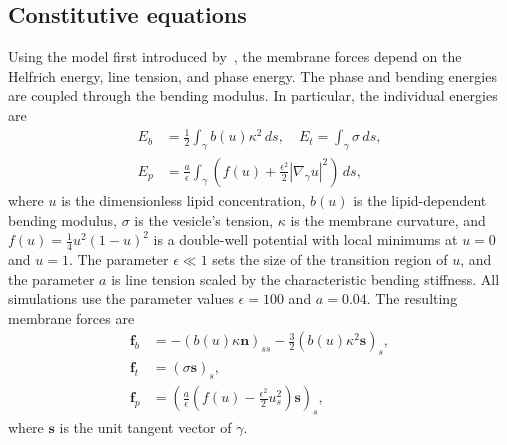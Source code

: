 \documentclass[twoside,twocolumn,9pt]{article}
\newcommand{\ff}{\mathbf{f}}
\newcommand{\nn}{\mathbf{n}}
\renewcommand{\ss}{\mathbf{s}}
\begin{document}
\subsection{Constitutive equations\label{subsec:const_eq}}
Using the model first introduced by~\citet{liu-mar-li-vee-low2017}, the
membrane forces depend on the Helfrich energy, line tension, and phase
energy. The phase and bending energies are coupled through the bending
modulus. In particular, the individual energies are
\begin{align}
  E_b &= \frac{1}{2}\int_{\gamma} b(u) \kappa^2 \, ds, \quad
  E_t = \int_{\gamma} \sigma \, ds, \\
  E_p &= \frac{a}{\epsilon}\int_{\gamma}\left(
  f(u) +\frac{\epsilon^2}{2}|\nabla_\gamma u|^2\right) \, ds,
  \label{eqn:PhaseEnergy}
\end{align}
where $u$ is the dimensionless lipid concentration, $b(u)$ is the
lipid-dependent bending modulus, $\sigma$ is the vesicle's tension,
$\kappa$ is the membrane curvature, and $f(u) = \frac{1}{4}u^2(1-u)^2$
is a double-well potential with local minimums at $u=0$ and $u=1$. The
parameter $\epsilon \ll 1$ sets the size of the transition region of
$u$, and the parameter $a$ is line tension scaled by the characteristic
bending stiffness. All simulations use the parameter values
$\epsilon=100$ and $a=0.04$. The resulting membrane forces are
\begin{align}
  \ff_b &= -(b(u)\kappa \nn)_{ss} -\frac{3}{2}
    \left(b(u) \kappa^2 \ss\right)_s, \\
  \ff_t &= (\sigma \ss)_s, \\
  \ff_p &= \left(\frac{a}{\epsilon}\left(f(u) -
     \frac{\epsilon^2}{2} u_s^2\right) \ss \right)_s,
\end{align}
where $\ss$ is the unit tangent vector of $\gamma$.
\end{document}
